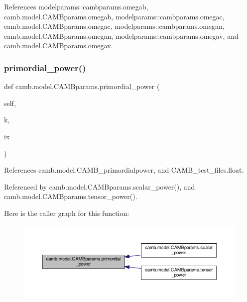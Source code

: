 References modelparams\+::cambparams.\+omegab, camb.\+model.\+C\+A\+M\+Bparams.\+omegab, modelparams\+::cambparams.\+omegac, camb.\+model.\+C\+A\+M\+Bparams.\+omegac, modelparams\+::cambparams.\+omegan, camb.\+model.\+C\+A\+M\+Bparams.\+omegan, modelparams\+::cambparams.\+omegav, and camb.\+model.\+C\+A\+M\+Bparams.\+omegav.

\mbox{\label{classcamb_1_1model_1_1CAMBparams_af4f79c770e6a0deeab17f54e07e1d002}} 
\subsubsection{\texorpdfstring{primordial\+\_\+power()}{primordial\_power()}}
{\footnotesize\ttfamily def camb.\+model.\+C\+A\+M\+Bparams.\+primordial\+\_\+power (\begin{DoxyParamCaption}\item[{}]{self,  }\item[{}]{k,  }\item[{}]{ix }\end{DoxyParamCaption})}



References camb.\+model.\+C\+A\+M\+B\+\_\+primordialpower, and C\+A\+M\+B\+\_\+test\+\_\+files.\+float.



Referenced by camb.\+model.\+C\+A\+M\+Bparams.\+scalar\+\_\+power(), and camb.\+model.\+C\+A\+M\+Bparams.\+tensor\+\_\+power().

Here is the caller graph for this function\+:
\nopagebreak
\begin{figure}[H]
\begin{center}
\leavevmode
\includegraphics[width=350pt]{classcamb_1_1model_1_1CAMBparams_af4f79c770e6a0deeab17f54e07e1d002_icgraph}
\end{center}
\end{figure}
\mbox{\label{classcamb_1_1model_1_1CAMBparams_ab0637ffdaf92a718a13b26adc99310ae}} 
